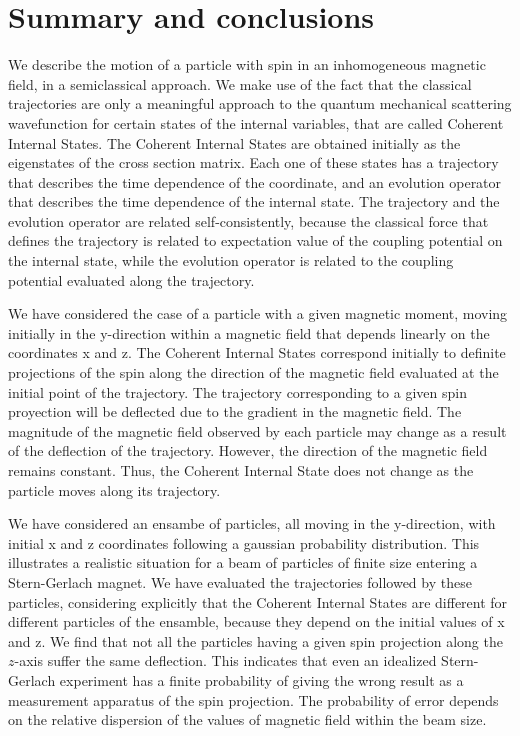\documentclass[aps,preprint,prl]{revtex4-2}
\begin{document}
\section{Summary and conclusions}

We describe the motion of a particle with spin in an inhomogeneous magnetic 
field, in a semiclassical approach. We make use of the fact that
the  classical trajectories are only a meaningful approach to the quantum
mechanical scattering wavefunction for certain states of the internal
variables, that are called Coherent Internal States. The Coherent Internal
States are obtained initially as the eigenstates of the cross section matrix. 
Each one of these states has a trajectory that describes the time dependence 
of the
coordinate, and an evolution operator that describes the time dependence 
 of the internal state. The trajectory and the evolution operator are 
related self-consistently, because the classical force that
defines the trajectory is related to expectation value of the coupling
potential on the internal state, while the evolution operator is related 
to the coupling potential evaluated along the trajectory.


We have considered the case of a particle with a given magnetic moment,
moving initially in the y-direction within a magnetic field that depends 
linearly on 
the coordinates x and z. The Coherent Internal States correspond 
initially to definite projections of the spin along the direction of the 
magnetic field 
evaluated at the initial point of the trajectory. The trajectory corresponding
to a given spin proyection will be deflected due to the gradient in the 
magnetic field. The magnitude of the magnetic field observed by each particle 
may change as a result of the deflection of the trajectory.
However, the direction of
the magnetic field remains constant. Thus, the Coherent Internal State does not
change as the particle moves along its trajectory.

We have considered an ensambe of particles, all moving in the y-direction,
with initial x and z coordinates following a gaussian probability distribution.
This illustrates a realistic situation for a beam of particles of finite size
entering a Stern-Gerlach magnet. We have evaluated the trajectories followed by
these particles, considering explicitly that the Coherent Internal States are
different for different particles of the ensamble, because they depend on
the initial values of x and z. We find that not all the particles having a 
given spin projection along the $z$-axis suffer the same deflection. 
This indicates that even
an idealized Stern-Gerlach experiment has a finite probability of giving
the wrong result as a measurement apparatus of the spin projection. The
probability of error depends on the relative dispersion of the values of 
magnetic field within the beam size.
\end{document}
